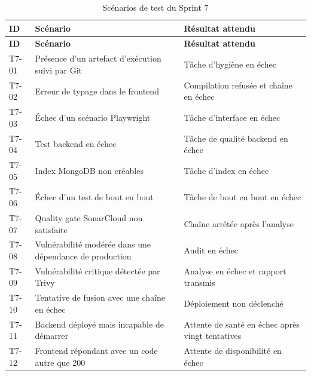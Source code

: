 {\footnotesize
\setlength{\tabcolsep}{4pt}
\begin{longtable}{|p{0.9cm}|>{\raggedright\arraybackslash}p{7cm}|>{\raggedright\arraybackslash}p{4.7cm}|}
\caption{Scénarios de test du Sprint 7}
\label{tab:tests-sprint7}\\
\hline
\textbf{ID} & \textbf{Scénario} & \textbf{Résultat attendu} \\
\hline
\endfirsthead

\hline
\textbf{ID} & \textbf{Scénario} & \textbf{Résultat attendu} \\
\hline
\endhead

T7-01 &
Présence d'un artefact d'exécution suivi par Git &
Tâche d'hygiène en échec \\
\hline

T7-02 &
Erreur de typage dans le frontend &
Compilation refusée et chaîne en échec \\
\hline

T7-03 &
Échec d'un scénario Playwright &
Tâche d'interface en échec \\
\hline

T7-04 &
Test backend en échec &
Tâche de qualité backend en échec \\
\hline

T7-05 &
Index MongoDB non créables &
Tâche d'index en échec \\
\hline

T7-06 &
Échec d'un test de bout en bout &
Tâche de bout en bout en échec \\
\hline

T7-07 &
Quality gate SonarCloud non satisfaite &
Chaîne arrêtée après l'analyse \\
\hline

T7-08 &
Vulnérabilité modérée dans une dépendance de production &
Audit en échec \\
\hline

T7-09 &
Vulnérabilité critique détectée par Trivy &
Analyse en échec et rapport transmis \\
\hline

T7-10 &
Tentative de fusion avec une chaîne en échec &
Déploiement non déclenché \\
\hline

T7-11 &
Backend déployé mais incapable de démarrer &
Attente de santé en échec après vingt tentatives \\
\hline

T7-12 &
Frontend répondant avec un code autre que 200 &
Attente de disponibilité en échec \\
\hline


\end{longtable}}

